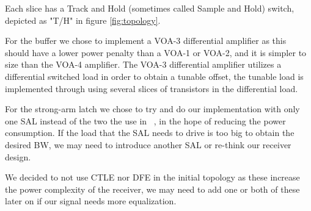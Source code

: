 Each slice has a Track and Hold (sometimes called Sample and Hold) switch, depicted as "T/H" in figure \ref{fig:topology}.

For the buffer we chose to implement a VOA-3 differential amplifier as this should have a lower power penalty than a VOA-1 or VOA-2, and it is simpler to size than the VOA-4 amplifier. The VOA-3 differential amplifier utilizes a differential switched load in order to obtain a tunable offset, the tunable load is implemented through using several slices of transistors in the differential load.

For the strong-arm latch we chose to try and do our implementation with only one SAL instead of the two the use in ~\cite{mahony2010a}, in the hope of reducing the power consumption. If the load that the SAL needs to drive is too big to obtain the desired BW, we may need to introduce another SAL or re-think our receiver design.

We decided to not use CTLE nor DFE in the initial topology as these increase the power complexity of the receiver, we may need to add one or both of these later on if our signal needs more equalization.
